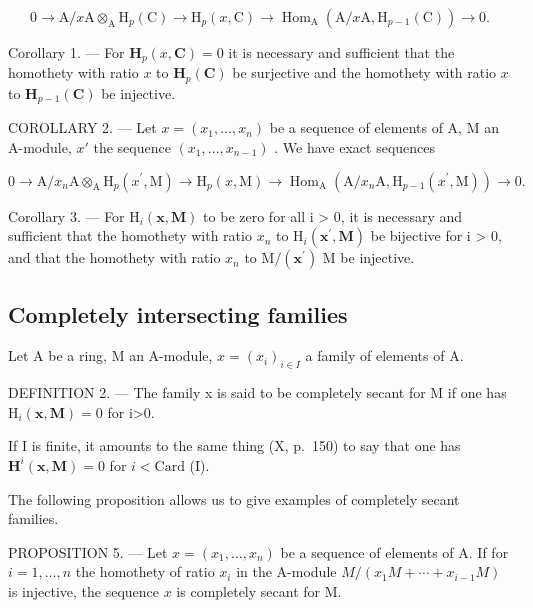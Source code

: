 \[
0 \rightarrow \mathrm{A} / x \mathrm{A} \otimes_ {\mathrm{A}} \mathrm{H} _ {p} (\mathrm{C}) \rightarrow \mathrm{H} _ {p} (x, \mathrm{C}) \rightarrow \operatorname{Hom} _ {\mathrm{A}} (\mathrm{A} / x \mathrm{A}, \mathrm{H} _ {p - 1} (\mathrm{C})) \rightarrow 0.
\]

Corollary 1. --- For \(\mathbf{H}_{p}(x,\mathbf{C})=0\) it is necessary and sufficient that the homothety with ratio \(x\) to \(\mathbf{H}_{p}(\mathbf{C})\) be surjective and the homothety with ratio \(x\) to \(\mathbf{H}_{p-1}(\mathbf{C})\) be injective.

COROLLARY 2. --- Let \(x = (x_1, \ldots, x_n)\) be a sequence of elements of A, M an A-module, \(x'\) the sequence \((x_1, \ldots, x_{n-1})\) . We have exact sequences

\[
0 \rightarrow \mathrm{A} / x _ {n} \mathrm{A} \otimes_ {\mathrm{A}} \mathrm{H} _ {p} (x ^ {\prime}, \mathrm{M}) \rightarrow \mathrm{H} _ {p} (x, \mathrm{M}) \rightarrow \operatorname{Hom} _ {\mathrm{A}} (\mathrm{A} / x _ {n} \mathrm{A}, \mathrm{H} _ {p - 1} (x ^ {\prime}, \mathrm{M})) \rightarrow 0.
\]

Corollary 3. --- For \(\mathrm{H}_{i}(\mathbf{x},\mathbf{M})\) to be zero for all i \textgreater{} 0, it is necessary and sufficient that the homothety with ratio \(x_{n}\) to \(\mathrm{H}_{i}(\mathbf{x}^{\prime},\mathbf{M})\) be bijective for i \textgreater{} 0, and that the homothety with ratio \(x_{n}\) to \(\mathrm{M}/(\mathbf{x}^{\prime})\) M be injective.

\subsection{Completely intersecting families}

Let A be a ring, M an A-module, \(x = (x_{i})_{i \in I}\) a family of elements of A.

DEFINITION 2. --- The family x is said to be completely secant for M if one has \(\mathrm{H}_{i}(\mathbf{x},\mathbf{M})=0\) for i\textgreater0.

If I is finite, it amounts to the same thing (X, p.~150) to say that one has \(\mathbf{H}^i (\pmb {x},\mathbf{M}) = 0\) for \(i <   \mathrm{Card}\) (I).

The following proposition allows us to give examples of completely secant families.

PROPOSITION 5. — Let \(x = (x_1, \ldots, x_n)\) be a sequence of elements of A. If for \(i=1, \ldots, n\) the homothety of ratio \(x_i\) in the A-module \(M/(x_1 M + \cdots + x_{i-1} M)\) is injective, the sequence \(x\) is completely secant for M.


